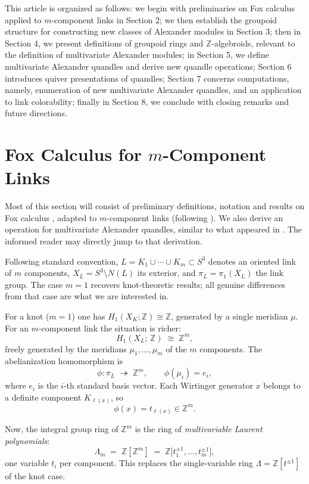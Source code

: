 \documentclass[a4paper,12pt]{article}
\newcommand{\Z}{\mathbb{Z}}
\newcommand{\Lm}{\Lambda_m}
\newcommand{\Lone}{\Lambda}
\begin{document}
This article is organized as follows:  we begin with preliminaries on Fox calculus applied to $m$-component links in Section 2; we then establish the groupoid structure for constructing new classes of Alexander modules in Section 3; then in Section 4, we present definitions of groupoid rings and $\Z$-algebroids, relevant to the definition of multivariate Alexander modules; in Section 5, we define multivariate Alexander quandles and derive new quandle operations; Section 6 introduces quiver presentations of quandles; Section 7 concerns computations, namely, enumeration of new multivariate Alexander quandles, and an application to link colorability; finally in Section 8, we conclude with closing remarks and future directions.


\section{Fox Calculus for $m$-Component Links}

Most of this section will consist of preliminary definitions, notation and results on Fox calculus \cite{fox1}, adapted to $m$-component links (following  \cite{crowellfox, hillman1981alexander, burde2013knots}). We also derive an operation for multivariate Alexander quandles, similar to what appeared in \cite{traldi1}. The informed reader may directly jump to that derivation.   

Following standard convention, $L = K_1 \cup \cdots \cup K_m \subset S^3$ denotes an oriented link of $m$ components, $X_L = S^3 \setminus N(L)$ its
exterior, and $\pi_L = \pi_1(X_L)$ the link group.
The case $m = 1$ recovers knot-theoretic results; all genuine
differences from that case are what we are interested in.


For a knot ($m=1$) one has $H_1(X_K;\Z) \cong \Z$, generated by a
single meridian $\mu$.
For an $m$-component link the situation is richer:
\[
  H_1(X_L;\,\Z) \;\cong\; \Z^m,
\]
freely generated by the meridians $\mu_1, \ldots, \mu_m$ of the $m$
components.
The abelianization homomorphism is
\[
  \phi \colon \pi_L \;\twoheadrightarrow\; \Z^m,
  \qquad
  \phi(\mu_i) = e_i,
\]
where $e_i$ is the $i$-th standard basis vector.
Each Wirtinger generator $x$ belongs to a definite component
$K_{\ell(x)}$, so
\[
  \phi(x) = t_{\ell(x)} \in \Z^m.
\]


Now, the integral group ring of $\Z^m$ is the ring of
\emph{multivariable Laurent polynomials}:
\[
  \Lm \;=\; \Z[\Z^m]
       \;=\; \Z\bigl[t_1^{\pm 1}, \ldots, t_m^{\pm 1}\bigr],
\]
one variable $t_i$ per component.
This replaces the single-variable ring
$\Lone = \Z[t^{\pm 1}]$ of the knot case.
\end{document}
